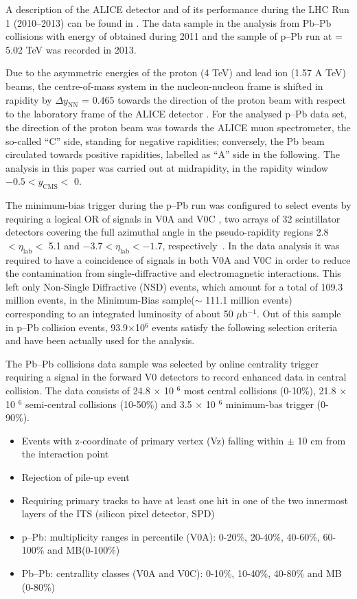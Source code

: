 A description of the ALICE detector and of its performance during the LHC Run 1 (2010--2013)
can be found in \cite{cite:ALICE, cite:ALICEPerformance}. The data sample in the analysis from Pb--Pb collisions with energy of  obtained during 2011 and the sample of p--Pb run at \snn = 5.02 TeV was recorded in 2013. 

Due to the asymmetric energies of the proton (4 TeV) and lead ion (1.57 A TeV) beams, the centre-of-mass system in the nucleon-nucleon frame is shifted in rapidity by $\Delta y_{\mathrm{NN}}$ = 0.465 towards the 
direction of the proton beam with respect to the laboratory frame of the ALICE detector \cite{cite:KphipPb}. 
For the analysed p--Pb data set, the direction of the proton beam was towards the ALICE muon spectrometer,
the so-called ``C'' side, standing for negative rapidities; conversely, the Pb beam circulated towards 
positive rapidities, labelled as ``A'' side in the following. The analysis in this paper was carried out at midrapidity, 
in the rapidity window $-0.5 < y_{\mathrm{CMS}} <$ 0.

The minimum-bias trigger during the p--Pb run was configured to select events by requiring a logical OR 
of signals in V0A and V0C \cite{cite:ALICEPerformance}, two arrays of 32 scintillator detectors 
covering the full azimuthal angle in the pseudo-rapidity regions 2.8 $< \eta_{\mathrm{lab}} <$ 5.1 and 
$-3.7 < \eta_{\mathrm{lab}} < -1.7$, respectively~\cite{cite:rapidity}. In the data analysis it was required to 
have a coincidence of signals in both V0A and V0C in order to reduce the contamination 
from single-diffractive and electromagnetic interactions. This left only Non-Single Diffractive (NSD) events, 
which amount for a total of 109.3 million events, in the Minimum-Bias sample($\sim$ 111.1 million events) corresponding 
to an integrated luminosity of about 50 $\mu$b$^{-1}$. Out of this sample in p--Pb collision events, 93.9$\times$10$^{6}$ events satisfy the following selection criteria and have been actually used for the analysis.

The Pb--Pb collisions data sample was selected by online centrality trigger requiring a signal in the forward V0 detectors\cite{cite:centralityPbPb}  to record enhanced data in central collision. The data consists of 24.8 $\times$ 10 $^{6}$  most central collisions (0-10\%), 21.8 $\times$ 10 $^{6}$ semi-central collisions (10-50\%) and 3.5 $\times$ 10 $^{6}$ minimum-bas trigger (0-90\%).


\begin{itemize}
\item Events with z-coordinate of primary vertex (Vz) falling within $\pm$ 10 cm from the interaction point  
\item Rejection of pile-up event 
\item Requiring primary tracks to have at least one hit in one of the two innermost layers of the ITS (silicon pixel detector, SPD) 
\item p--Pb: multiplicity ranges in percentile (V0A): 0-20\%, 20-40\%, 40-60\%, 60-100\% and MB(0-100\%) 
\item Pb--Pb: centrallity classes (V0A and V0C): 0-10\%, 10-40\%, 40-80\% and MB (0-80\%)  
\end{itemize}


